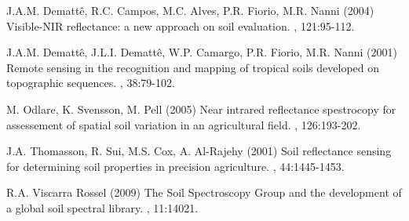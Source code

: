 \begin{footnotesize}
\begin{thebibliography}{99}
J.A.M. Demattê, R.C. Campos, M.C. Alves, P.R. Fiorio, M.R. Nanni (2004)
\newblock Visible-NIR reflectance: a new approach on soil evaluation.
, 121:95-112.

J.A.M. Demattê, J.L.I. Demattê, W.P. Camargo, P.R. Fiorio, M.R. Nanni (2001)
\newblock Remote sensing in the recognition and mapping of tropical soils developed on topographic sequences.
, 38:79-102.

M. Odlare, K. Svensson, M. Pell (2005)
\newblock Near intrared reflectance spestrocopy for assessement of spatial soil variation in an agricultural field.
, 126:193-202.

J.A. Thomasson, R. Sui, M.S. Cox, A. Al-Rajehy (2001)
\newblock Soil reflectance sensing for determining soil properties in precision agriculture.
, 44:1445-1453.

R.A. Viscarra Rossel (2009)
\newblock The Soil Spectroscopy Group and the development of a global soil spectral library.
, 11:14021.

\end{thebibliography}
\end{footnotesize}

\address{José Alexandre M. Demattê\\
  Departamento de Ciência do Solo, ESALQ/USP\\
  }
  
\address{Marilusa P. C. Lacerda\\
  Faculdade de Agronomia e Medicina Veterinária, FAV/UnB\\
  }
